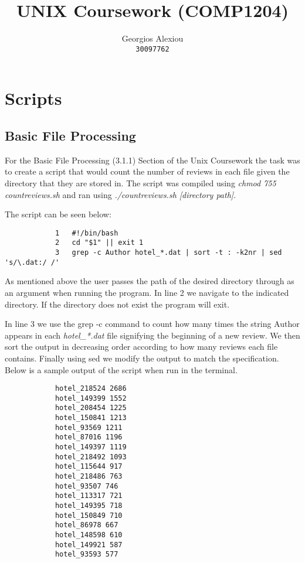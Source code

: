 \documentclass[titlepage]{article}
\title{UNIX Coursework (COMP1204)}
\author{Georgios Alexiou \\ {\tt 30097762}}
\begin{document}
\maketitle

    \section{Scripts}
    
        \subsection{Basic File Processing\label{bfp}}
        
            For the Basic File Processing (3.1.1) Section of the Unix Coursework the task was to create a script that would count the number of reviews in each file given the directory that they are stored in. The script was compiled using \textit{chmod 755 countreviews.sh} and ran using \textit{./countreviews.sh [directory path]}.
            
            The script can be seen below:
            
            \begin{lstlisting}
            1   #!/bin/bash
            2   cd "$1" || exit 1
            3   grep -c Author hotel_*.dat | sort -t : -k2nr | sed 's/\.dat:/ /'
            \end{lstlisting}
            
            As mentioned above the user passes the path of the desired directory through as an argument when running the program. In line 2 we navigate to the indicated directory. If the directory does not exist the program will exit. 
            
            In line 3 we use the grep -c command to count how many times the string Author appears in each \textit{hotel\_*.dat} file signifying the beginning of a new review. We then sort the output in decreasing order according to how many reviews each file contains. Finally using sed we modify the output to match the specification. Below is a sample output of the script when run in the terminal.
            
            \begin{lstlisting}
            hotel_218524 2686
            hotel_149399 1552
            hotel_208454 1225
            hotel_150841 1213
            hotel_93569 1211
            hotel_87016 1196
            hotel_149397 1119
            hotel_218492 1093
            hotel_115644 917
            hotel_218486 763
            hotel_93507 746
            hotel_113317 721
            hotel_149395 718
            hotel_150849 710
            hotel_86978 667
            hotel_148598 610
            hotel_149921 587
            hotel_93593 577
            \end{lstlisting}
            
\end{document}
